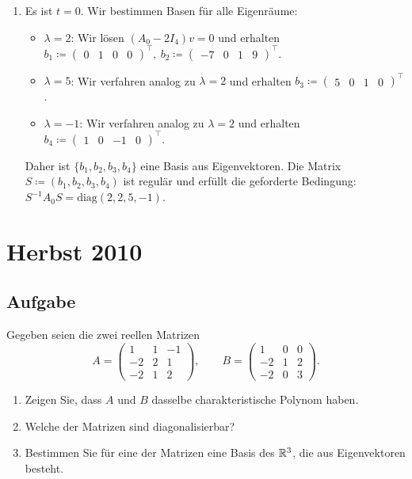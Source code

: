 \begin{enumerate}
	 \item Es ist \( t = 0 \). Wir bestimmen Basen für alle Eigenräume:
	 \begin{itemize}
	 	\item \( \lambda = 2 \): Wir lösen \( (A_0-2I_4)v = 0 \) und erhalten \( b_1 \coloneqq \begin{pmatrix}
	 	 		0 & 1 & 0 & 0 
	 	 	\end{pmatrix}^\top, \ b_2 \coloneqq \begin{pmatrix}
	 	 		-7 & 0 & 1 & 9
	 	 	\end{pmatrix}^\top \).
	 	 \item \( \lambda = 5 \): Wir verfahren analog zu \( \lambda = 2 \) und erhalten \( b_3 \coloneqq \begin{pmatrix}
	 	 		5 & 0 & 1 & 0
	 	 	\end{pmatrix}^\top \).
	 	 \item \( \lambda = -1 \): Wir verfahren analog zu \( \lambda = 2 \) und erhalten \( b_4 \coloneqq \begin{pmatrix}
	 	 		1 & 0 & -1 & 0
	 	 	\end{pmatrix}^\top \).
	 \end{itemize}
	 Daher ist \( \{ b_1, b_2, b_3, b_4 \} \) eine Basis aus Eigenvektoren. Die Matrix \( S \coloneqq (b_1, b_2, b_3, b_4) \) ist regulär und erfüllt die geforderte Bedingung: \( S^{-1}A_0S = \text{diag}(2, 2, 5, -1) \).
\end{enumerate}


\section{Herbst 2010}

\subsection{Aufgabe}
Gegeben seien die zwei reellen Matrizen
\begin{equation*}
	A = \begin{pmatrix}
		1 & 1 & -1 \\
		-2 & 2 & 1 \\
		-2 & 1 & 2
	\end{pmatrix}, \qquad B = \begin{pmatrix}
		1 & 0 & 0 \\
		-2 & 1 & 2 \\
		-2 & 0 & 3
	\end{pmatrix}\text{.}
\end{equation*}
\begin{enumerate}
	\item Zeigen Sie, dass \( A \) und \( B \) dasselbe charakteristische Polynom haben.
	\item Welche der Matrizen sind diagonalisierbar?
	\item Bestimmen Sie für eine der Matrizen eine Basis des \( \mathbb{R}^3 \), die aus Eigenvektoren besteht.
\end{enumerate}

